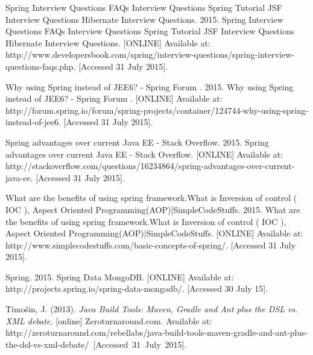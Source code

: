 \begin{flushleft}
\begin{thebibliography}{99}
	 Spring Interview Questions FAQs Interview Questions Spring Tutorial JSF Interview Questions Hibernate Interview Questions. 2015. Spring Interview Questions FAQs Interview Questions Spring Tutorial JSF Interview Questions Hibernate Interview Questions. [ONLINE] Available at: http://www.developersbook.com/spring/interview-questions/spring-interview-questions-faqs.php. [Accessed 31 July 2015].
	
	 Why using Spring instead of JEE6? - Spring Forum . 2015. Why using Spring instead of JEE6? - Spring Forum . [ONLINE] Available at: http://forum.spring.io/forum/spring-projects/container/124744-why-using-spring-instead-of-jee6. [Accessed 31 July 2015].
	
	 Spring advantages over current Java EE - Stack Overflow. 2015. Spring advantages over current Java EE - Stack Overflow. [ONLINE] Available at: http://stackoverflow.com/questions/16234864/spring-advantages-over-current-java-ee. [Accessed 31 July 2015].
	
	 What are the benefits of using spring framework.What is Inversion of control ( IOC ), Aspect Oriented Programming(AOP)|SimpleCodeStuffs. 2015. What are the benefits of using spring framework.What is Inversion of control ( IOC ), Aspect Oriented Programming(AOP)|SimpleCodeStuffs. [ONLINE] Available at: http://www.simplecodestuffs.com/basic-concepts-of-spring/. [Accessed 31 July 2015].
	
	 Spring. 2015. Spring Data MongoDB. [ONLINE] Available at: http://projects.spring.io/spring-data-mongodb/. [Accessed 30 July 15].

	 Timošin, J. (2013). \textit{Java Build Tools: Maven, Gradle and Ant plus the DSL vs. XML debate.} [online] Zeroturnaround.com. Available at: http://zeroturnaround.com/rebellabs/java-build-tools-maven-gradle-and-ant-plus-the-dsl-vs-xml-debate/~[Accessed~31~July~2015].

\end{thebibliography}
\end{flushleft}
